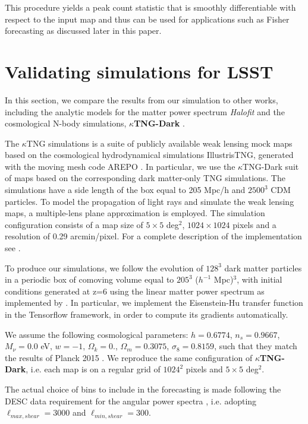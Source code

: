 \documentclass{aa}
\begin{document}
This procedure yields a peak count statistic that is smoothly differentiable with respect to the input map and thus can be used for applications such as Fisher forecasting as discussed later in this paper.

\section{Validating simulations for LSST}\label{Validating_simulations_for_LSST_Y}
In this section, we compare the results from our simulation to other works, including the analytic models for the matter power spectrum \textit{Halofit} \citep{smith2003stable,takahashi2012revising} and the cosmological N-body simulations, \textbf{$\kappa$TNG-Dark} \citep{osato2021kappatng}.


The $\kappa$TNG simulations is a suite of publicly available weak lensing mock maps based on the cosmological hydrodynamical simulations IllustrisTNG, generated with the moving mesh code AREPO \citep{2010MNRAS.401..791S}.
In particular, we use the $\kappa$TNG-Dark suit of maps based on the corresponding dark matter-only TNG simulations. 
The simulations have a side length of the box equal to 205 Mpc/h and $2500^3$ CDM particles.
To model the propagation of light rays and simulate the weak lensing maps, a multiple-lens plane approximation is employed. 
The simulation configuration consists of a map size of $5\times5$ deg$^2$, $1024\times 1024$ pixels and a resolution of 0.29 arcmin/pixel. 
For a complete description of the implementation see \cite{osato2021kappatng}.


To produce our simulations, we follow the evolution of $128^3$ dark matter particles in a periodic box of comoving volume equal to $205^3$ ($h^{-1}$ Mpc)$^3$, with initial conditions generated at z=6 using the linear matter power spectrum as implemented by \cite{eisenstein1998baryonic}. In particular, we implement the  Eisenstein-Hu transfer function in the Tensorflow framework, in order to compute its gradients automatically.

We assume the following cosmological parameters: $h=0.6774$, $n_s =0.9667$, $M_{\nu} = 0.0$ eV, $w=-1$, $\Omega_k = 0.$, $\Omega_m=0.3075$, $\sigma_8= 0.8159$, such that they match the results of Planck 2015 \citep{ade2016planck}.
We reproduce the same configuration of \textbf{$\kappa$TNG-Dark}, i.e. each map is on a regular grid of $1024^2$ pixels and $5\times 5$ deg$^2$.


The actual choice of bins to include in the forecasting is made following the DESC data requirement for the angular power spectra \citep{mandelbaum2018lsst}, i.e. adopting $\ell_{max,shear} = 3000$ and  $\ell_{min,shear} = 300$. 
\end{document}
